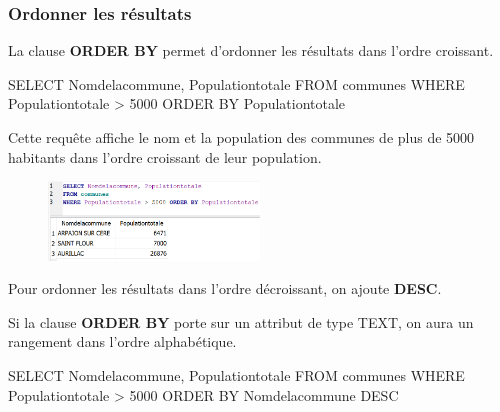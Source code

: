 \documentclass[
  a4paper,
  DIV=11,
  numbers=noendperiod]{scrartcl}
\newenvironment{Shaded}{\begin{snugshade}}{\end{snugshade}}
\newcommand{\DecValTok}[1]{\textcolor[rgb]{0.68,0.00,0.00}{#1}}
\newcommand{\KeywordTok}[1]{\textcolor[rgb]{0.00,0.23,0.31}{#1}}
\newcommand{\NormalTok}[1]{\textcolor[rgb]{0.00,0.23,0.31}{#1}}
\newcommand{\OperatorTok}[1]{\textcolor[rgb]{0.37,0.37,0.37}{#1}}
\begin{document}
\hypertarget{ordonner-les-ruxe9sultats}{%
\subsubsection{Ordonner les résultats}\label{ordonner-les-ruxe9sultats}}

La clause \textbf{ORDER BY} permet d'ordonner les résultats dans l'ordre
croissant.

\begin{Shaded}
\begin{Highlighting}[]
\KeywordTok{SELECT}\NormalTok{ Nomdelacommune, Populationtotale}
\KeywordTok{FROM}\NormalTok{ communes}
\KeywordTok{WHERE}\NormalTok{ Populationtotale }\OperatorTok{\textgreater{}} \DecValTok{5000} \KeywordTok{ORDER} \KeywordTok{BY}\NormalTok{ Populationtotale}
\end{Highlighting}
\end{Shaded}

Cette requête affiche le nom et la population des communes de plus de
5000 habitants dans l'ordre croissant de leur population.

\begin{figure}

{\centering \includegraphics[width=0.5\textwidth,height=\textheight]{SQL5.png}

}

\end{figure}

Pour ordonner les résultats dans l'ordre décroissant, on ajoute
\textbf{DESC}.

Si la clause \textbf{ORDER BY} porte sur un attribut de type TEXT, on
aura un rangement dans l'ordre alphabétique.

\begin{Shaded}
\begin{Highlighting}[]
\KeywordTok{SELECT}\NormalTok{ Nomdelacommune, Populationtotale}
\KeywordTok{FROM}\NormalTok{ communes}
\KeywordTok{WHERE}\NormalTok{ Populationtotale }\OperatorTok{\textgreater{}} \DecValTok{5000} \KeywordTok{ORDER} \KeywordTok{BY}\NormalTok{ Nomdelacommune }\KeywordTok{DESC}
\end{Highlighting}
\end{Shaded}
\end{document}
